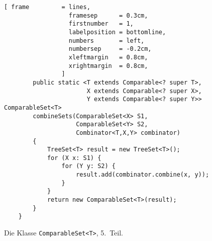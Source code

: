 \begin{figure}[!ht]
\centering
\begin{Verbatim}[ frame         = lines, 
                  framesep      = 0.3cm, 
                  firstnumber   = 1,
                  labelposition = bottomline,
                  numbers       = left,
                  numbersep     = -0.2cm,
                  xleftmargin   = 0.8cm,
                  xrightmargin  = 0.8cm,
                ]
        public static <T extends Comparable<? super T>, 
                       X extends Comparable<? super X>, 
                       Y extends Comparable<? super Y>> ComparableSet<T>
        combineSets(ComparableSet<X> S1, 
                    ComparableSet<Y> S2, 
                    Combinator<T,X,Y> combinator) 
        {
            TreeSet<T> result = new TreeSet<T>();
            for (X x: S1) {
                for (Y y: S2) {
                    result.add(combinator.combine(x, y));
                }
            }
            return new ComparableSet<T>(result);
        }
    }    
\end{Verbatim}
\vspace*{-0.3cm}
\caption{Die Klasse \texttt{ComparableSet<T>}, 5.~Teil.}
\label{fig:ComparableSet-5}
\end{figure}


